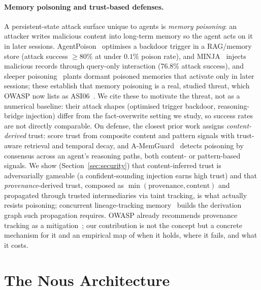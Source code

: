 \documentclass[11pt,a4paper,twocolumn]{article}
\begin{document}
\paragraph{Memory poisoning and trust-based defenses.}
A persistent-state attack surface unique to agents is \emph{memory poisoning}:
an attacker writes malicious content into long-term memory so the agent acts on
it in later sessions. AgentPoison~\citep{chen2024agentpoison} optimises a
backdoor trigger in a RAG/memory store (attack success $\ge 80\%$ at under
$0.1\%$ poison rate), and MINJA~\citep{dong2025minja} injects malicious records
through query-only interaction (76.8\% attack success), and sleeper
poisoning~\citep{pulipaka2026sleeper} plants dormant poisoned memories that
activate only in later sessions; these establish that memory poisoning is a
real, studied threat, which OWASP now lists
as ASI06~\citep{owasp2026agentic}. We cite these to motivate the threat, not as
a numerical baseline: their attack shapes (optimised trigger backdoor,
reasoning-bridge injection) differ from the fact-overwrite setting we study, so
success rates are not directly comparable. On defense, the closest prior work
assigns \emph{content-derived} trust: \citet{mempoison2026} score trust from
composite content and pattern signals with trust-aware retrieval and temporal
decay, and A-MemGuard~\citep{wei2025amemguard} detects poisoning by consensus
across an agent's reasoning paths, both content- or pattern-based signals. We
show (Section~\ref{sec:security}) that content-inferred trust is
adversarially gameable (a confident-sounding injection earns high trust) and
that \emph{provenance}-derived trust, composed as
$\min(\text{provenance},\text{content})$ and propagated through trusted
intermediaries via taint tracking, is what actually resists poisoning;
concurrent lineage-tracking memory~\citep{ouyang2026memlineage} builds the
derivation graph such propagation requires. OWASP
already recommends provenance tracking as a mitigation~\citep{owasp2026agentic};
our contribution is not the concept but a concrete mechanism for it and an
empirical map of when it holds, where it fails, and what it costs.

\section{The Nous Architecture}
\label{sec:arch}
\end{document}
